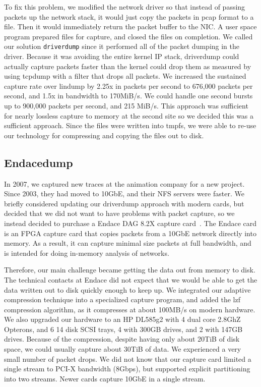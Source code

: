 To fix this problem, we modified the network driver so that instead of
passing packets up the network stack, it would just copy the
packets in pcap format to a file. Then it would
immediately return the packet buffer to the NIC.  A user space
program prepared files for capture, and closed the files on
completion.  We called our solution {\tt driverdump} since it
performed all of the packet dumping in the driver.  Because it was
avoiding the entire kernel IP stack, driverdump could actually capture
packets faster than the kernel could drop them as measured by using
tcpdump with a filter that drops all packets.  We increased the
sustained capture rate over lindump by 2.25x in packets per second to
676,000 packets per second, and 1.5x in bandwidth to 170MiB/s.  We
could handle one second bursts up to 900,000 packets per second, and
215 MiB/s.  This approach was sufficient for nearly lossless capture
to memory at the second site so we decided this was a sufficient
approach.  Since the files were written into tmpfs, we were able to
re-use our technology for compressing and copying the files out to
disk.

\subsection{Endacedump}

In 2007, we captured new traces at the animation company for a new
project.  Since 2003, they had moved to 10GbE, and their NFS servers
were faster. We briefly considered updating our driverdump approach
with modern cards, but decided that we did not want to have problems
with packet capture, so we instead decided to purchase a Endace DAG
8.2X capture card~\cite{endace-cards}.  The Endace card is an FPGA
capture card that copies packets from a 10GbE network directly into
memory.  As a result, it can capture minimal size packets at full
bandwidth, and is intended for doing in-memory analysis of networks.

Therefore, our main challenge became getting the data out from memory
to disk.  The technical contacts at Endace did not expect that we
would be able to get the data written out to disk quickly enough to
keep up.  We integrated our adaptive compression technique into a
specialized capture program, and added the lzf~\cite{lzf} compression
algorithm, as it compresses at about 100MB/s on modern hardware.  We
also upgraded our hardware to an HP DL585g2 with 4 dual core 2.8GhZ
Opterons, and 6 14 disk SCSI trays, 4 with 300GB drives, and 2 with
147GB drives.  Because of the compression, despite having only about
20TiB of disk space, we could usually capture about 30TiB of data.  We
experienced a very small number of packet drops. We did not know that
our capture card limited a single stream to PCI-X bandwidth (8Gbps),
but supported explicit partitioning into two streams.
Newer cards capture 10GbE in a single stream.

